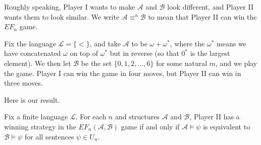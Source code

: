 \documentclass[../notes.tex]{subfiles}
\begin{document}
Roughly speaking, Player I wants to make $\mathcal A$ and $\mathcal B$ look different, and Player II wants them to look similar. We write $\mathcal A\equiv^n\mathcal B$ to mean that Player II can win the $EF_n$ game.
\begin{example}
	Fix the language $\mathcal L=\{<\}$, and take $\mathcal A$ to be $\omega+\omega^*$, where the $\omega^*$ means we have concatenated $\omega$ on top of $\omega^*$ but in reverse (so that $0^*$ is the largest element). We then let $\mathcal B$ be the set $\{0,1,2,\ldots,6\}$ for some natural $m$, and we play the game. Player I can win the game in four moves, but Player II can win in three moves.
\end{example}
Here is our result.
\begin{proposition} \label{prop:winning-ef-game}
	Fix a finite language $\mathcal L$. For each $n$ and structures $\mathcal A$ and $\mathcal B$, Player II has a winning strategy in the $EF_n(\mathcal A,\mathcal B)$ game if and only if $\mathcal A\models\psi$ is equivalent to $\mathcal B\models\psi$ for all sentences $\psi\in U_n$.
\end{proposition}
\end{document}

